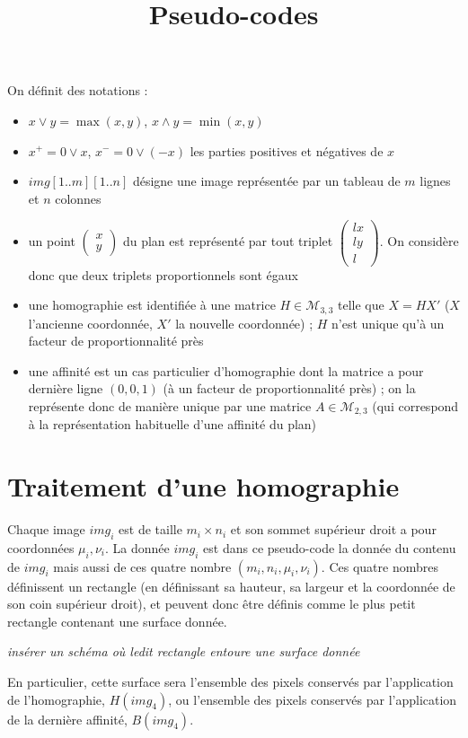 \documentclass[a4paper,11pt]{article}
\title{Pseudo-codes}
\newcommand{\pmatrice}[1]{\begin{pmatrix} #1 \end{pmatrix}}
\newcommand{\pgcd}{\wedge}
\newcommand{\ppcm}{\vee}
\begin{document}
 \maketitle
 On définit des notations :
 \begin{itemize}
 \item $x \ppcm y = \max(x,y)$, $x \pgcd y = \min(x,y)$
 \item $x^+ = 0 \ppcm x$, $x^- = 0 \ppcm (-x)$ les parties positives et négatives de $x$
 \item $img[1..m][1..n]$ désigne une image représentée par un tableau de $m$ lignes et $n$ colonnes
 \item un point $\pmatrice{x\\y}$ du plan est représenté par tout triplet $\pmatrice{lx\\ly\\l}$. On considère donc que deux triplets proportionnels sont égaux
 \item une homographie est identifiée à une matrice $H \in \mathcal{M}_{3,3}$ telle que $X=HX'$ ($X$ l'ancienne coordonnée, $X'$ la nouvelle coordonnée) ; $H$ n'est unique qu'à un facteur de proportionnalité près
 \item une affinité est un cas particulier d'homographie dont la matrice a pour dernière ligne $(0,0,1)$ (à un facteur de proportionnalité près) ; on la représente donc de manière unique par une matrice $A \in \mathcal{M}_{2,3}$ (qui correspond à la représentation habituelle d'une affinité du plan)
 \end{itemize}
 
 \section*{Traitement d'une homographie}
    Chaque image $img_i$ est de taille $m_i \times n_i$ et son sommet supérieur droit a pour coordonnées $\mu_i,\nu_i$. La donnée $img_i$ est dans ce pseudo-code la donnée du contenu de $img_i$ mais aussi de ces quatre nombre $(m_i,n_i,\mu_i,\nu_i)$. Ces quatre nombres définissent un rectangle (en définissant sa hauteur, sa largeur et la coordonnée de son coin supérieur droit), et peuvent donc être définis comme le plus petit rectangle contenant une surface donnée.
    
    \textit{insérer un schéma où ledit rectangle entoure une surface donnée}
    
    En particulier, cette surface sera l'ensemble des pixels conservés par l'application de l'homographie, $H(img_4)$, ou l'ensemble des pixels conservés par l'application de la dernière affinité, $B(img_4)$.
    
\end{document}
